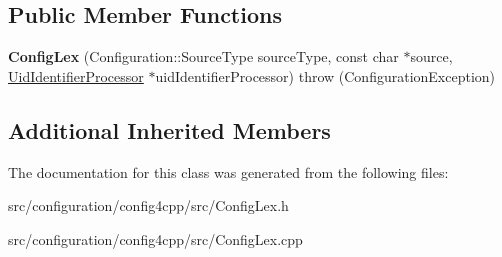 \subsection*{Public Member Functions}
\begin{DoxyCompactItemize}
\item 
\hypertarget{classCONFIG4CPP__NAMESPACE_1_1ConfigLex_a25fa2137da6a6d495d4a9c20100e44e8}{{\bfseries Config\-Lex} (Configuration\-::\-Source\-Type source\-Type, const char $\ast$source, \hyperlink{classCONFIG4CPP__NAMESPACE_1_1UidIdentifierProcessor}{Uid\-Identifier\-Processor} $\ast$uid\-Identifier\-Processor)  throw (\-Configuration\-Exception)}\label{classCONFIG4CPP__NAMESPACE_1_1ConfigLex_a25fa2137da6a6d495d4a9c20100e44e8}

\end{DoxyCompactItemize}
\subsection*{Additional Inherited Members}


The documentation for this class was generated from the following files\-:\begin{DoxyCompactItemize}
\item 
src/configuration/config4cpp/src/Config\-Lex.\-h\item 
src/configuration/config4cpp/src/Config\-Lex.\-cpp\end{DoxyCompactItemize}
